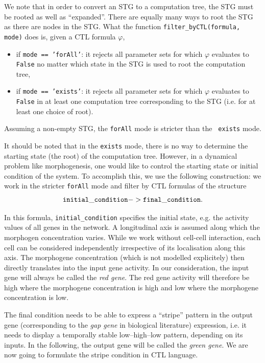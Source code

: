 \documentclass{article}
\begin{document}
\begin{flushleft}
We note that in order to convert an STG to a computation tree, the STG must be
rooted as well as ``expanded''. There are equally many ways to root the STG as
there are nodes in the STG. What the function {\tt filter\_byCTL(formula, mode)}
does is, given a CTL formula $\varphi$, 
\begin{itemize}
  \item if {\tt mode == 'forAll'}: it rejects all parameter sets for which
  $\varphi$ evaluates to {\tt False} no matter which state in the STG is used to
  root the computation tree,
  \item if {\tt mode == 'exists'}: it rejects all parameter sets for which
  $\varphi$ evaluates to {\tt False} in at least one computation tree
  corresponding to the STG (i.e. for at least one choice of root).
\end{itemize}

Assuming a non-empty STG, the {\tt forAll} mode is stricter than the {\tt
exists} mode.

It should be noted that in the {\tt exists} mode, there is no way to determine
the starting state (the root) of the computation tree. However, in a dynamical
problem like morphogenesis, one would like to control the starting state or
initial condition of the system. To accomplish this, we use the following
construction: we work in the stricter {\tt forAll} mode and filter by CTL
formulas of the structure
\begin{equation}
{\tt initial\_condition -> final\_condition}.
\end{equation}

In this formula, {\tt initial\_condition} specifies the initial state, e.g. the
activity values of all genes in the network. A longitudinal axis is assumed
along which the morphogen concentration varies. While we work without cell-cell
interaction, each cell can be considered independently irrespective of its
localisation along this axis. The morphogene concentration (which is not
modelled explicitely) then directly translates into the input gene activity. In
our consideration, the input gene will always be called the {\it red gene}. The
red gene activity will therefore be high where the morphogene concentration is
high and low where the morphogene concentration is low.

The final condition needs to be able to express a ``stripe'' pattern in the
output gene (corresponding to the {\it gap gene} in biological literature)
expression, i.e. it needs to display a temporally stable low--high--low pattern,
depending on its inputs. In the following, the output gene will be called the
{\it green gene}. We are now going to formulate the stripe condition in CTL
language.


\end{flushleft}
\end{document}
